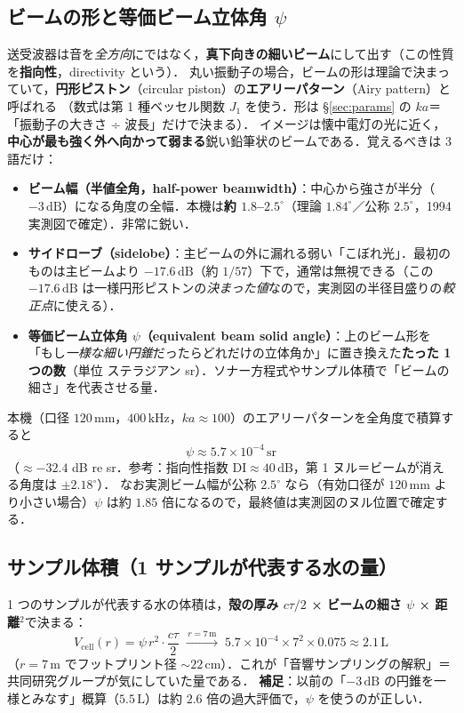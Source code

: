 \documentclass[11pt]{ltjsarticle}
\newcommand{\unit}[1]{\,\mathrm{#1}}
\begin{document}
\subsection{ビームの形と等価ビーム立体角 $\psi$}
\label{ssec:beam}
送受波器は音を\emph{全方向}にではなく，\textbf{真下向きの細いビーム}にして出す（この性質を\textbf{指向性}，directivity という）．
丸い振動子の場合，ビームの形は理論で決まっていて，\textbf{円形ピストン}（circular piston）の\textbf{エアリーパターン}（Airy pattern）と呼ばれる
（数式は第 1 種ベッセル関数 $J_1$ を使う．形は \S\ref{sec:params} の $ka$＝「振動子の大きさ ÷ 波長」だけで決まる）．
イメージは懐中電灯の光に近く，\textbf{中心が最も強く外へ向かって弱まる}鋭い鉛筆状のビームである．覚えるべきは 3 語だけ：
\begin{itemize}[nosep]
  \item \textbf{ビーム幅（半値全角，half-power beamwidth）}：中心から強さが半分（$-3\unit{dB}$）になる角度の全幅．本機は\textbf{約 $1.8$–$2.5^\circ$}（理論 $1.84^\circ$／公称 $2.5^\circ$，1994 実測図で確定）．非常に鋭い．
  \item \textbf{サイドローブ（sidelobe）}：主ビームの外に漏れる弱い「こぼれ光」．最初のものは主ビームより $-17.6\unit{dB}$（約 $1/57$）下で，通常は無視できる（この $-17.6\unit{dB}$ は一様円形ピストンの\emph{決まった値}なので，実測図の半径目盛りの\emph{較正点}に使える）．
  \item \textbf{等価ビーム立体角 $\psi$（equivalent beam solid angle）}：上のビーム形を「もし\emph{一様な細い円錐}だったらどれだけの立体角か」に置き換えた\textbf{たった 1 つの数}（単位 ステラジアン sr）．ソナー方程式やサンプル体積で「ビームの細さ」を代表させる量．
\end{itemize}
本機（口径 $120\unit{mm}$，$400\unit{kHz}$，$ka\approx100$）のエアリーパターンを全角度で積算すると
\begin{equation}
\boxed{\;\psi\approx5.7\times10^{-4}\unit{sr}\;}
\end{equation}
（$\approx-32.4$ dB re sr．参考：指向性指数 $\mathrm{DI}\approx40\unit{dB}$，第 1 ヌル＝ビームが消える角度は $\pm2.18^\circ$）．
なお実測ビーム幅が公称 $2.5^\circ$ なら（有効口径が $120\unit{mm}$ より小さい場合）$\psi$ は約 $1.85$ 倍になるので，最終値は実測図のヌル位置で確定する．

\subsection{サンプル体積（1 サンプルが代表する水の量）}
1 つのサンプルが代表する水の体積は，\textbf{殻の厚み $c\tau/2$ × ビームの細さ $\psi$ × 距離$^2$}で決まる：
\begin{equation}
V_{\mathrm{cell}}(r)=\psi\,r^2\cdot\frac{c\tau}{2}
\;\xrightarrow{\,r=7\unit{m}\,}\; 5.7\times10^{-4}\times7^2\times0.075\approx 2.1\unit{L}
\end{equation}
（$r=7\unit{m}$ でフットプリント径 $\sim22\unit{cm}$）．これが「音響サンプリングの解釈」＝共同研究グループが気にしていた量である．
\textbf{補足}：以前の「$-3\unit{dB}$ の円錐を一様とみなす」概算（$5.5\unit{L}$）は約 $2.6$ 倍の過大評価で，$\psi$ を使うのが正しい．
\end{document}
